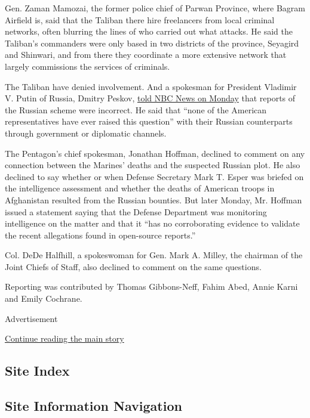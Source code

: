 Gen. Zaman Mamozai, the former police chief of Parwan Province, where
Bagram Airfield is, said that the Taliban there hire freelancers from
local criminal networks, often blurring the lines of who carried out
what attacks. He said the Taliban's commanders were only based in two
districts of the province, Seyagird and Shinwari, and from there they
coordinate a more extensive network that largely commissions the
services of criminals.

The Taliban have denied involvement. And a spokesman for President
Vladimir V. Putin of Russia, Dmitry Peskov,
\href{https://www.nbcnews.com/news/us-news/trump-says-no-credible-intel-russia-offered-taliban-bounty-payments-n1232376}{told
NBC News on Monday} that reports of the Russian scheme were incorrect.
He said that ``none of the American representatives have ever raised
this question'' with their Russian counterparts through government or
diplomatic channels.

The Pentagon's chief spokesman, Jonathan Hoffman, declined to comment on
any connection between the Marines' deaths and the suspected Russian
plot. He also declined to say whether or when Defense Secretary Mark T.
Esper was briefed on the intelligence assessment and whether the deaths
of American troops in Afghanistan resulted from the Russian bounties.
But later Monday, Mr. Hoffman issued a statement saying that the Defense
Department was monitoring intelligence on the matter and that it ``has
no corroborating evidence to validate the recent allegations found in
open-source reports.''

Col. DeDe Halfhill, a spokeswoman for Gen. Mark A. Milley, the chairman
of the Joint Chiefs of Staff, also declined to comment on the same
questions.

Reporting was contributed by Thomas Gibbons-Neff, Fahim Abed, Annie
Karni and Emily Cochrane.

Advertisement

\protect\hyperlink{after-bottom}{Continue reading the main story}

\hypertarget{site-index}{%
\subsection{Site Index}\label{site-index}}

\hypertarget{site-information-navigation}{%
\subsection{Site Information
Navigation}\label{site-information-navigation}}

